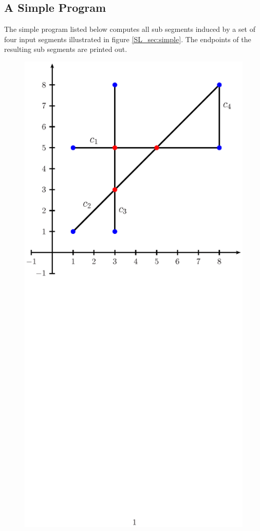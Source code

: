 \subsection{A Simple Program}
The simple program listed below computes all sub segments induced by 
a set of four input segments illustrated in figure \ref{SL_sec:simple}.
The endpoints of the resulting sub segments are printed out.

\begin{figure}[hbp]
\begin{ccTexOnly}
\centerline{\includegraphics{sl_simple.ps}}
\end{ccTexOnly}


\end{figure}
